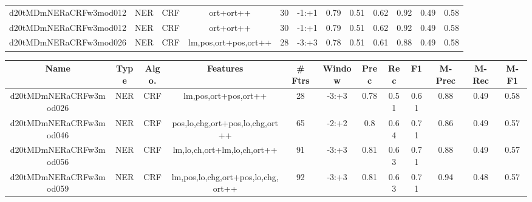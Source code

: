 \documentclass[a4paper]{article}
\begin{document}
\begin{landscape}
\begin{center}
\begin{tabular}{ |c|c|c|c|c|c|c|c|c|c|c|c|}
 	
 
 	
 		
 		\small{ d20tMDmNERaCRFw3mod012 } & NER & CRF & ort+ort++  &  30 &  -1:+1  &  0.79 & 0.51 & 0.62  &  0.92 & 0.49 & 0.58 \\
 		

 	
 
 	
 		
 		\small{ d20tMDmNERaCRFw3mod012 } & NER & CRF & ort+ort++  &  30 &  -1:+1  &  0.79 & 0.51 & 0.62  &  0.92 & 0.49 & 0.58 \\
 		

 	
 
 	
 		
 		\small{ d20tMDmNERaCRFw3mod026 } & NER & CRF & lm,pos,ort+pos,ort++  &  28 &  -3:+3  &  0.78 & 0.51 & 0.61  &  0.88 & 0.49 & 0.58 \\
 		
 \hline
\end{tabular}
\end{center}




\begin{center}
\begin{tabular}{ |c|c|c|c|c|c|c|c|c|c|c|c|} 
 \hline
 	Name & Type & Algo. & Features & \# Ftrs & Window & Prec & Rec & F1 & M-Prec & M-Rec & M-F1\\
 \hline

 		

 	
 
 	
 		
 		\small{ d20tMDmNERaCRFw3mod026 } & NER & CRF & lm,pos,ort+pos,ort++  &  28 &  -3:+3  &  0.78 & 0.51 & 0.61  &  0.88 & 0.49 & 0.58 \\
 		

 	
 
 	
 		
 		\small{ d20tMDmNERaCRFw3mod046 } & NER & CRF & pos,lo,chg,ort+pos,lo,chg,ort++  &  65 &  -2:+2  &  0.8 & 0.64 & 0.71  &  0.86 & 0.49 & 0.57 \\
 		

 	
 
 	
 		
 		\small{ d20tMDmNERaCRFw3mod056 } & NER & CRF & lm,lo,ch,ort+lm,lo,ch,ort++  &  91 &  -3:+3  &  0.81 & 0.63 & 0.71  &  0.88 & 0.49 & 0.57 \\
 		

 	
 
 	
 		
 		\small{ d20tMDmNERaCRFw3mod059 } & NER & CRF & lm,pos,lo,chg,ort+pos,lo,chg,ort++  &  92 &  -3:+3  &  0.81 & 0.63 & 0.71  &  0.94 & 0.48 & 0.57 \\
 		


\end{tabular}
\end{center}
\end{landscape}
\end{document}

